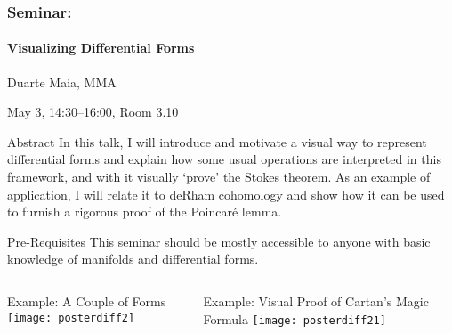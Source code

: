 \documentclass{beamer}
\begin{document}
\begin{frame}[t]{}
\frametitle{\VeryHuge Seminar:}
\framesubtitle{\VeryHuge Visualizing Differential Forms}
\begin{block}{}
\centering
\huge Duarte Maia, MMA

\LARGE May 3, 14:30--16:00, Room 3.10
\end{block}
\begin{block}{\Large Abstract}
\large
In this talk, I will introduce and motivate a visual way to represent differential forms and explain how some usual operations are interpreted in this framework, and with it visually `prove' the Stokes theorem. As an example of application, I will relate it to deRham cohomology and show how it can be used to furnish a rigorous proof of the Poincaré lemma.



\end{block}
\begin{block}{Pre-Requisites}
\large This seminar should be mostly accessible to anyone with basic knowledge of manifolds and differential forms.
\end{block}
\begin{columns}[t]
	\begin{column}{.4 \linewidth}
		\begin{block}{Example: A Couple of Forms}
		\texttt{[image: posterdiff2]}
		\end{block}
	\end{column}
	\begin{column}{.58 \linewidth}
		\begin{block}{Example: Visual Proof of Cartan's Magic Formula}
		\texttt{[image: posterdiff21]}
		\end{block}
	\end{column}
\end{columns}
\end{frame}
\end{document}
